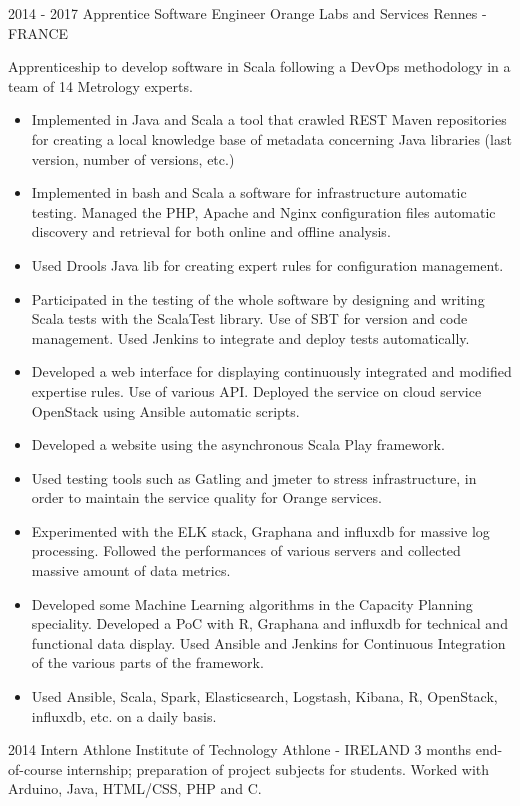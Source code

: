 \documentclass[11pt,a4paper,sans]{moderncv}        %
\begin{document}
\cventry
	{2014 - 2017}
	{Apprentice Software Engineer}
	{Orange Labs and Services}
	{Rennes - FRANCE}
	{}
	{Apprenticeship to develop software in Scala following a DevOps methodology in a team of 14 Metrology experts. 
	\begin{itemize}
	\item Implemented in Java and Scala a tool that crawled REST Maven repositories for creating a local knowledge base of metadata concerning Java libraries (last version, number of versions, etc.)
    \item Implemented in bash and Scala a software for infrastructure automatic testing. Managed the PHP, Apache and Nginx configuration files automatic discovery and retrieval for both online and offline analysis.
    \item Used Drools Java lib for creating expert rules for configuration management.
  	\item Participated in the testing of the whole software by designing and writing Scala tests with the ScalaTest library. Use of SBT for version and code management. Used Jenkins to integrate and deploy tests automatically.
    \item Developed a web interface for displaying continuously integrated and modified expertise rules. Use of various API. Deployed the service on cloud service OpenStack using Ansible automatic scripts.
    \item Developed a website using the asynchronous Scala Play framework.
    \item Used testing tools such as Gatling and jmeter to stress infrastructure, in order to maintain the service quality for Orange services.    
    \item Experimented with the ELK stack, Graphana and influxdb for massive log processing. Followed the performances of various servers and collected massive amount of data metrics.
    \item Developed some Machine Learning algorithms in the Capacity Planning speciality. Developed a PoC with R, Graphana and influxdb for technical and functional data display. Used Ansible and Jenkins for Continuous Integration of the various parts of the framework.
	\item Used Ansible, Scala, Spark, Elasticsearch, Logstash, Kibana, R, OpenStack, influxdb, etc. on a daily basis.	
	\end{itemize}
}

\cventry
    {2014}
    {Intern}
    {Athlone Institute of Technology}
    {Athlone - IRELAND}
    {}
    {3 months end-of-course internship; preparation of project subjects for students. Worked with Arduino, Java, HTML/CSS, PHP and C.}
\end{document}
